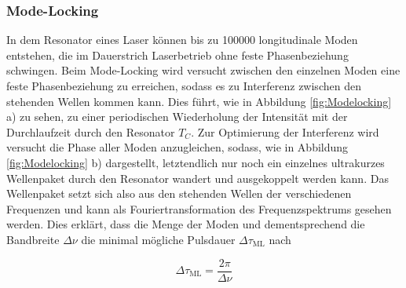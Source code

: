     \subsubsection{Mode-Locking}
      In dem Resonator eines Laser können bis zu 100000 longitudinale Moden entstehen, die im Dauerstrich Laserbetrieb ohne feste Phasenbeziehung schwingen. Beim Mode-Locking wird versucht zwischen den 
      einzelnen Moden eine feste Phasenbeziehung zu erreichen, sodass es zu Interferenz zwischen den stehenden Wellen kommen kann. Dies führt, wie in Abbildung \ref{fig:Modelocking} a) zu sehen, zu einer 
      periodischen Wiederholung der Intensität mit der Durchlaufzeit durch den Resonator $T_C$. Zur Optimierung der Interferenz wird versucht die Phase aller Moden anzugleichen, sodass, wie in 
      Abbildung \ref{fig:Modelocking} b) dargestellt, letztendlich nur noch ein einzelnes ultrakurzes Wellenpaket durch den Resonator wandert und ausgekoppelt werden kann. Das Wellenpaket setzt sich also
      aus den stehenden Wellen der verschiedenen Frequenzen und kann als Fouriertransformation des Frequenzspektrums gesehen werden. Dies erklärt, dass die Menge der Moden und dementsprechend die 
      Bandbreite $\Delta\nu$ die minimal mögliche Pulsdauer $\Delta\tau_{\text{ML}}$ nach

      \begin{equation*}
        \Delta\tau_{\text{ML}} = \frac{2\pi}{\Delta\nu}
      \end{equation*}

